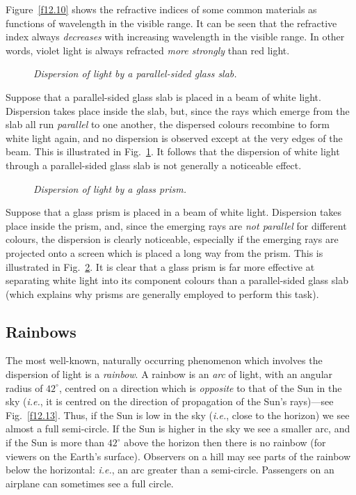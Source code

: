 Figure~\ref{f12.10} shows the refractive indices of
some common materials  as functions of wavelength in the
visible range. It can be seen that the refractive index
always {\em decreases}\/ with increasing wavelength in the visible range.
In other words, violet light is always refracted 
{\em more strongly}\/ than
red light.

\begin{figure}
\epsfysize=3in
\centerline{}
\caption{\em Dispersion of light by a parallel-sided glass slab.}\label{f12.11}
\end{figure}

Suppose that a  parallel-sided glass slab is placed in a beam of white
light. Dispersion takes place inside the slab, but, since
the rays which emerge from the slab
all run {\em parallel} to one another, the
dispersed colours  recombine to form white light again, and no dispersion
is observed except at the very edges of the beam.
This is illustrated in Fig.~\ref{f12.11}. 
 It follows that the
dispersion of white light through a parallel-sided glass slab is
not generally a noticeable effect. 

\begin{figure}
\epsfysize=2.5in
\centerline{}
\caption{\em Dispersion of light by a glass prism.}\label{f12.12}
\end{figure}

Suppose that a glass prism is placed in a beam of white light.
Dispersion takes place inside the prism, and, since the
emerging rays are {\em not parallel}\/ for different colours, the
dispersion is clearly noticeable, especially if the emerging
rays are projected onto a screen which is placed a
 long way from the prism. This
is illustrated in Fig.~\ref{f12.12}. It is clear that a glass prism
is far more effective at separating white
light into its component
colours than a parallel-sided glass slab (which explains why 
 prisms are generally employed to perform this task). 

\subsection{Rainbows}
The most well-known, naturally occurring phenomenon which involves the
dispersion of light is a {\em rainbow}. A rainbow is an
{\em arc}
 of light, with an angular radius of $42^\circ$, centred
on a direction which is {\em  opposite}\/
 to that of the Sun in the
sky ({\em i.e.}, it is centred on the
direction of propagation of
the Sun's rays)---see Fig.~\ref{f12.13}. Thus, if the Sun is low in the sky ({\em i.e.}, close to the horizon) we see almost
a full semi-circle. If the Sun is higher in the sky we see a smaller arc, and
if the Sun is more than $42^\circ$ above the horizon then there is
no rainbow (for viewers on the Earth's surface). Observers on a
hill may see parts of the rainbow below the horizontal:
{\em i.e.},  an arc
greater than a semi-circle. Passengers on an airplane can sometimes
see a full circle. 

